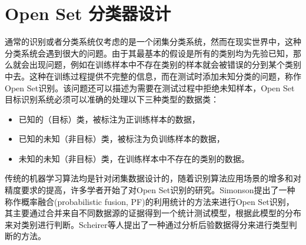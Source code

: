 \section{Open Set 分类器设计}
\label{sec:sei_method}
通常的识别或者分类系统仅考虑的是一个闭集分类系统，然而在现实世界中，这种分类系统会遇到很大的问题。由于其最基本的假设是所有的类别均为先验已知，那么就会出现问题，例如在训练样本中不存在类别的样本就会被错误的分到某个类别中去。这种在训练过程提供不完整的信息，而在测试时添加未知分类的问题，称作Open Set识别。该问题还可以描述为需要在测试过程中拒绝未知样本，Open Set目标识别系统必须可以准确的处理以下三种类型的数据类：
\begin{itemize}
	\item 已知的（目标）类，被标注为正训练样本的数据，
	\item 已知的未知（非目标）类，被标注为负训练样本的数据，
	\item 未知的未知（非目标）类，在训练样本中不存在的类别的数据。
\end{itemize}
传统的机器学习算法均是针对闭集数据设计的，随着识别算法应用场景的增多和对精度要求的提高，许多学者开始了对Open Set识别的研究。Simonson提出了一种称作概率融合(probabilistic fusion, PF)的利用统计的方法来进行Open Set识别，其主要通过合并来自不同数据源的证据得到一个统计测试模型，根据此模型的分布来对类别进行判断。Scheirer等人提出了一种通过分析后验数据得分来进行类型判断的方法。

